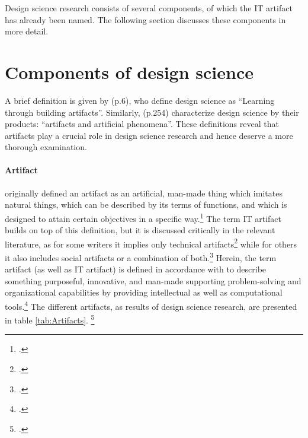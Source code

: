 Design science research consists of several components, of which the \ac{IT} artifact has already been named. The following section discusses these components in more detail.

\section{Components of design science} \label{sec:ComponentsDesignScience}
A brief definition is given by \cite{VaishnaviDesignScienceResearch} (p.6), who define design science as \enquote{Learning through building artifacts}. Similarly, \cite{MarchDesignnaturalscience1995} (p.254) characterize design science by their products: \enquote{artifacts and artificial phenomena}. These definitions reveal that artifacts play a crucial role in design science research and hence deserve a more thorough examination.

\paragraph{Artifact} \cite{Simonsciencesartificial1996} originally defined an artifact as an artificial, man-made thing which imitates natural things, which can be described by its terms of functions, and which is designed to attain certain objectives in a specific way.\footcites[Cf.][p.5]{Simonsciencesartificial1996} The term \ac{IT} artifact builds on top of this definition, but it is discussed critically in the relevant literature, as for some writers it implies only technical artifacts\footcites[Cf.][p.186]{BenbasatEmpiricalresearchinformation1999}[cf.][p.50]{AlterconceptITartifact2015}[cf.][p.121]{OrlikowskiResearchcommentaryDesperately2001} while for others it also includes social artifacts or a combination of both.\footcites[Cf.][p.1, p.6]{LeeGoingbackbasics2015}[cf.][p.59]{AlterconceptITartifact2015} Herein, the term artifact (as well as \ac{IT} artifact) is defined in accordance with \cite{HevnerDesignScienceResearch2004} to describe something purposeful, innovative, and man-made supporting problem-solving and organizational capabilities by providing intellectual as well as computational tools.\footcites[Cf.][p.76 et seqq]{HevnerDesignScienceResearch2004}[cf.][p.340]{GregorPositioningpresentingdesign2013} The different artifacts, as results of design science research, are presented in table \ref{tab:Artifacts}. \footcites[Cf.][p.256 et seq]{MarchDesignnaturalscience1995}[cf.][p.50]{PuraoDesignResearchTechnology2002}[cf.][p.77]{HevnerDesignResearchInformation2010}


